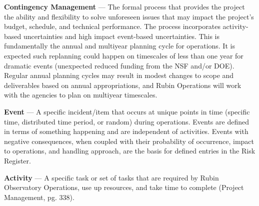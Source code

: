 \textbf{Contingency Management} ---
The formal process that provides the project the ability and flexibility to solve unforeseen issues that may impact the project’s budget, schedule, and technical performance.
The process incorporates activity-based uncertainties and high impact event-based uncertainties.
This is fundamentally the annual and multiyear planning cycle for operations.
It is expected such replanning could happen on timescales of less than one year for dramatic events (unexpected reduced funding from the NSF and/or DOE).
Regular annual planning cycles may result in modest changes to scope and deliverables based on annual appropriations, and Rubin Operations will work with the agencies to plan on multiyear timescales.

\textbf{Event} ---
A specific incident/item that occurs at unique points in time (specific time, distributed time period, or random) during operations.
Events are defined in terms of something happening and are independent of activities.
Events with negative consequences, when coupled with their probability of occurrence, impact to operations, and handling approach, are the basis for defined entries in the Risk Register.

\textbf{Activity} ---
A specific task or set of tasks that are required by Rubin Observatory Operations, use up resources, and take time to complete (Project Management, pg. 338).
